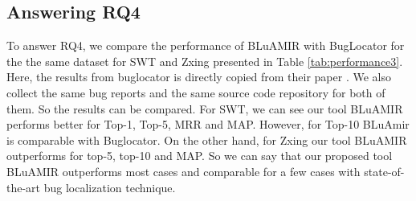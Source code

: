 \documentclass[conference]{IEEEtran}
\begin{document}
\subsection{Answering RQ4}\label{RQ4answer}
To answer RQ4, we compare the performance of BLuAMIR with BugLocator for the the same dataset for SWT and Zxing presented in Table \ref{tab:performance3}. Here, the results from buglocator is directly copied from their paper \cite{Jian}. We also collect the same bug reports and the same source code repository for both of them. So the results can be compared. For SWT, we can see our tool BLuAMIR performs better for Top-1, Top-5, MRR and MAP. However, for Top-10 BLuAmir is comparable with Buglocator. On the other hand, for Zxing our tool BLuAMIR outperforms for top-5, top-10 and MAP. So we can say that our proposed tool BLuAMIR outperforms most cases and comparable for a few cases with state-of-the-art bug localization technique.
\end{document}
